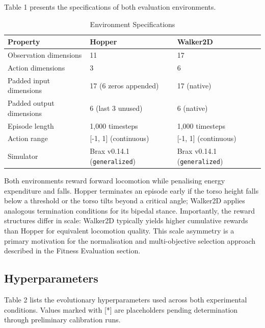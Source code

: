 \documentclass[12pt]{article}
\begin{document}
Table 1 presents the specifications of both evaluation environments.

\begin{table}[h]
\centering
\caption{Environment Specifications}
\begin{tabular}{|l|l|l|}
\hline
\textbf{Property} & \textbf{Hopper} & \textbf{Walker2D} \\
\hline
Observation dimensions & 11 & 17 \\
\hline
Action dimensions & 3 & 6 \\
\hline
Padded input dimensions & 17 (6 zeros appended) & 17 (native) \\
\hline
Padded output dimensions & 6 (last 3 unused) & 6 (native) \\
\hline
Episode length & 1,000 timesteps & 1,000 timesteps \\
\hline
Action range & [-1, 1] (continuous) & [-1, 1] (continuous) \\
\hline
Simulator & Brax v0.14.1 (\texttt{generalized}) & Brax v0.14.1 (\texttt{generalized}) \\
\hline
\end{tabular}
\end{table}

Both environments reward forward locomotion while penalising energy expenditure and falls. Hopper terminates an episode early if the torso height falls below a threshold or the torso tilts beyond a critical angle; Walker2D applies analogous termination conditions for its bipedal stance. Importantly, the reward structures differ in scale: Walker2D typically yields higher cumulative rewards than Hopper for equivalent locomotion quality. This scale asymmetry is a primary motivation for the normalisation and multi-objective selection approach described in the Fitness Evaluation section.

\subsection{Hyperparameters}

Table 2 lists the evolutionary hyperparameters used across both experimental conditions. Values marked with [*] are placeholders pending determination through preliminary calibration runs.
\end{document}
